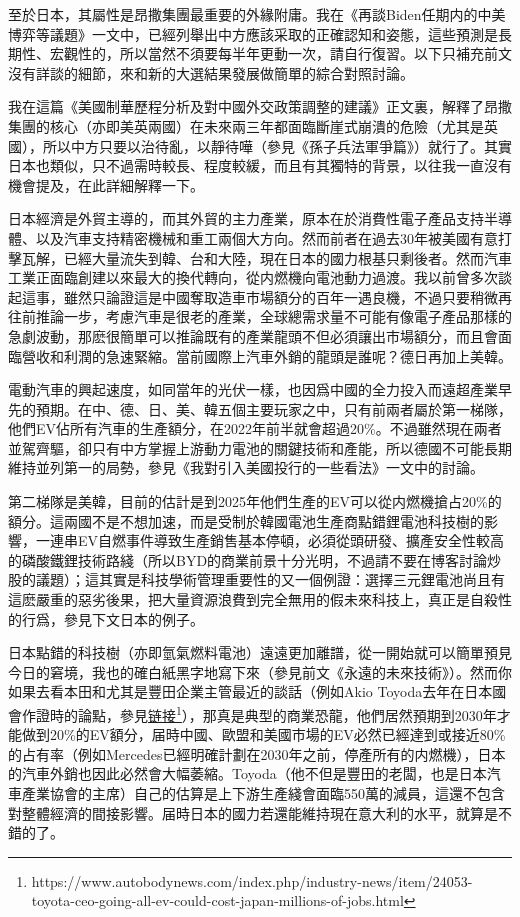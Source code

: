 \documentclass[twocolumn]{ctexart}
\begin{document}
至於日本，其屬性是昂撒集團最重要的外緣附庸。我在《再談Biden任期内的中美博弈等議題》一文中，已經列舉出中方應該采取的正確認知和姿態，這些預測是長期性、宏觀性的，所以當然不須要每半年更動一次，請自行復習。以下只補充前文沒有詳談的細節，來和新的大選結果發展做簡單的綜合對照討論。

我在這篇《美國制華歷程分析及對中國外交政策調整的建議》正文裏，解釋了昂撒集團的核心（亦即美英兩國）在未來兩三年都面臨斷崖式崩潰的危險（尤其是英國），所以中方只要以治待亂，以靜待嘩（參見《孫子兵法軍爭篇》）就行了。其實日本也類似，只不過需時較長、程度較緩，而且有其獨特的背景，以往我一直沒有機會提及，在此詳細解釋一下。

日本經濟是外貿主導的，而其外貿的主力產業，原本在於消費性電子產品支持半導體、以及汽車支持精密機械和重工兩個大方向。然而前者在過去30年被美國有意打擊瓦解，已經大量流失到韓、台和大陸，現在日本的國力根基只剩後者。然而汽車工業正面臨創建以來最大的換代轉向，從内燃機向電池動力過渡。我以前曾多次談起這事，雖然只論證這是中國奪取造車市場額分的百年一遇良機，不過只要稍微再往前推論一步，考慮汽車是很老的產業，全球總需求量不可能有像電子產品那樣的急劇波動，那麽很簡單可以推論既有的產業龍頭不但必須讓出市場額分，而且會面臨營收和利潤的急速緊縮。當前國際上汽車外銷的龍頭是誰呢？德日再加上美韓。

電動汽車的興起速度，如同當年的光伏一樣，也因爲中國的全力投入而遠超產業早先的預期。在中、德、日、美、韓五個主要玩家之中，只有前兩者屬於第一梯隊，他們EV佔所有汽車的生產額分，在2022年前半就會超過20\%。不過雖然現在兩者並駕齊驅，卻只有中方掌握上游動力電池的關鍵技術和產能，所以德國不可能長期維持並列第一的局勢，參見《我對引入美國投行的一些看法》一文中的討論。

第二梯隊是美韓，目前的估計是到2025年他們生產的EV可以從内燃機搶占20\%的額分。這兩國不是不想加速，而是受制於韓國電池生產商點錯鋰電池科技樹的影響，一連串EV自燃事件導致生產銷售基本停頓，必須從頭研發、擴產安全性較高的磷酸鐵鋰技術路綫（所以BYD的商業前景十分光明，不過請不要在博客討論炒股的議題）；這其實是科技學術管理重要性的又一個例證：選擇三元鋰電池尚且有這麽嚴重的惡劣後果，把大量資源浪費到完全無用的假未來科技上，真正是自殺性的行爲，參見下文日本的例子。

日本點錯的科技樹（亦即氫氣燃料電池）遠遠更加離譜，從一開始就可以簡單預見今日的窘境，我也的確白紙黑字地寫下來（參見前文《永遠的未來技術》）。然而你如果去看本田和尤其是豐田企業主管最近的談話（例如Akio Toyoda去年在日本國會作證時的論點，參見\href{https://www.autobodynews.com/index.php/industry-news/item/24053-toyota-ceo-going-all-ev-could-cost-japan-millions-of-jobs.html}{链接\footnote{\url{https://www.autobodynews.com/index.php/industry-news/item/24053-toyota-ceo-going-all-ev-could-cost-japan-millions-of-jobs.html}}}），那真是典型的商業恐龍，他們居然預期到2030年才能做到20\%的EV額分，届時中國、歐盟和美國市場的EV必然已經達到或接近80\%的占有率（例如Mercedes已經明確計劃在2030年之前，停產所有的内燃機），日本的汽車外銷也因此必然會大幅萎縮。Toyoda（他不但是豐田的老闆，也是日本汽車產業協會的主席）自己的估算是上下游生產綫會面臨550萬的減員，這還不包含對整體經濟的間接影響。届時日本的國力若還能維持現在意大利的水平，就算是不錯的了。
\end{document}
